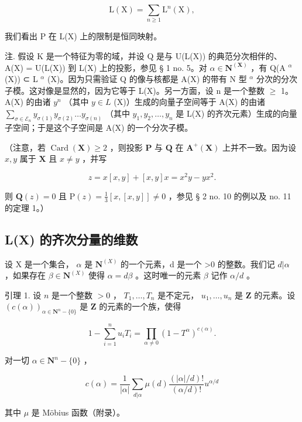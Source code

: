 \[
\mathrm{L} (\mathrm{X}) = \sum_ {n \geqslant 1} \mathrm{L} ^ {n} (\mathrm{X}),
\]

我们看出 P 在 L(X) 上的限制是恒同映射。

注. 假设 K 是一个特征为零的域，并设 Q 是与 U(L(X)) 的典范分次相伴的、A(X) = U(L(X)) 到 L(X) 上的投影，参见 § 1 no. 5。对 \(\alpha \in \mathbf{N}^{(\mathbf{X})}\) ，有 Q(A \(^\alpha\) (X)) ⊂ L \(^\alpha\) (X)。因为只需验证 Q 的像与核都是 A(X) 的带有 N 型 \(^\alpha\) 分次的分次子模。这对像是显然的，因为它等于 L(X)。另一方面，设 n 是一个整数 \(\geqslant\) 1。A(X) 的由诸 \(y^n\) （其中 \(y \in L\) (X)）生成的向量子空间等于 A(X) 的由诸 \(\sum_{\sigma \in \mathcal{E}_n} y_{\sigma(1)} y_{\sigma(2)} \ldots y_{\sigma(n)}\) （其中 \(y_1, y_2, \ldots, y_n\) 是 L(X) 的齐次元素）生成的向量子空间；于是这个子空间是 A(X) 的一个分次子模。

（注意，若 \(\operatorname{Card}(\mathbf{X}) \geqslant 2\) ，则投影 \(\mathbf{P}\) 与 \(\mathbf{Q}\) 在 \(\mathbf{A}^{+}(\mathbf{X})\) 上并不一致。因为设 \(x, y\) 属于 \(\mathbf{X}\) 且 \(x \neq y\) ，并写

\[
z = x [ x, y ] + [ x, y ] x = x ^ {2} y - y x ^ {2}.
\]

则 \(\mathbf{Q}(z) = 0\) 且 \(\mathrm{P}(z) = \frac{1}{3}[x, [x,y]] \neq 0\) ，参见 § 2 no. 10 的例以及 no. 11 的定理 1。）

\subsection{L(X) 的齐次分量的维数}

设 X 是一个集合， \(\alpha\) 是 \(\mathbf{N}^{(X)}\) 的一个元素，d 是一个 >0 的整数。我们记 \(d|\alpha\) ，如果存在 \(\beta\in\mathbf{N}^{(X)}\) 使得 \(\alpha=d\beta\) 。这时唯一的元素 \(\beta\) 记作 \(\alpha/d\) 。

引理 1. 设 \(n\) 是一个整数 \(>0\) ， \(T_1, \ldots, T_n\) 是不定元， \(u_1, \ldots, u_n\) 是 \(\mathbf{Z}\) 的元素。设 \((c(\alpha))_{\alpha \in \mathbf{N}^n - \{0\}}\) 是 \(\mathbf{Z}\) 的元素的一个族，使得

\[
1 - \sum_ {i = 1} ^ {n} u _ {i} T _ {i} = \prod_ {\alpha \neq 0} (1 - T ^ {\alpha}) ^ {c (\alpha)}.\tag{7}
\]

对一切 \(\alpha \in \mathbf{N}^n - \{0\}\) ，

\[
c (\alpha) = \frac {1}{| \alpha |} \sum_ {d | \alpha} \mu (d) \frac {(| \alpha | / d) !}{(\alpha / d) !} u ^ {\alpha / d}\tag{8}
\]

其中 \(\mu\) 是 Möbius 函数（附录）。

